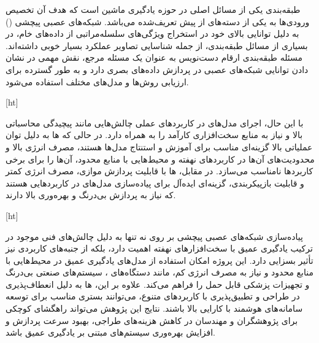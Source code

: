 
\label{فصل۱:مقدمه}


طبقه‌بندی یکی از مسائل اصلی در حوزه یادگیری ماشین است که هدف آن تخصیص ورودی‌ها به یکی از دسته‌های از پیش تعریف‌شده می‌باشد. شبکه‌های عصبی پیچشی () به دلیل توانایی بالای خود در استخراج ویژگی‌های سلسله‌مراتبی از داده‌های خام، در بسیاری از مسائل طبقه‌بندی، از جمله شناسایی تصاویر عملکرد بسیار خوبی داشته‌اند. مسئله طبقه‌بندی ارقام دست‌نویس به عنوان یک مسئله مرجع، نقش مهمی در نشان دادن توانایی شبکه‌های عصبی در پردازش داده‌های بصری دارد و به طور گسترده برای ارزیابی روش‌ها و مدل‌های مختلف استفاده می‌شود.

[ht]

با این حال، اجرای مدل‌های  در کاربردهای عملی چالش‌هایی مانند پیچیدگی محاسباتی بالا و نیاز به منابع سخت‌افزاری کارآمد را به همراه دارد. در حالی که ها به دلیل توان عملیاتی بالا گزینه‌ای مناسب برای آموزش و استنتاج مدل‌ها هستند، مصرف انرژی بالا و محدودیت‌های آن‌ها در کاربردهای نهفته و محیط‌هایی با منابع محدود، آن‌ها را برای برخی کاربردها نامناسب می‌سازد. در مقابل، ‌ها با قابلیت پردازش موازی، مصرف انرژی کمتر و قابلیت بازپیکربندی، گزینه‌ای ایده‌آل برای پیاده‌سازی مدل‌های  در کاربردهایی هستند که نیاز به پردازش بی‌درنگ و بهره‌وری بالا دارند.

[ht]




پیاده‌سازی شبکه‌های عصبی پیچشی بر روی  نه تنها به دلیل چالش‌های فنی موجود در ترکیب یادگیری عمیق با سخت‌افزارهای نهفته اهمیت دارد، بلکه از جنبه‌های کاربردی نیز تأثیر بسزایی دارد. این پروژه امکان استفاده از مدل‌های یادگیری عمیق در محیط‌هایی با منابع محدود و نیاز به مصرف انرژی کم، مانند دستگاه‌های ، سیستم‌های صنعتی بی‌درنگ و تجهیزات پزشکی قابل حمل را فراهم می‌کند. علاوه بر این، ‌ها به دلیل انعطاف‌پذیری در طراحی و تطبیق‌پذیری با کاربردهای متنوع، می‌توانند بستری مناسب برای توسعه سامانه‌های هوشمند با کارایی بالا باشند. نتایج این پژوهش می‌تواند راهگشای کوچکی برای پژوهشگران و مهندسان در کاهش هزینه‌های طراجی، بهبود سرعت پردازش و افزایش بهره‌وری سیستم‌های مبتنی بر یادگیری عمیق باشد.


